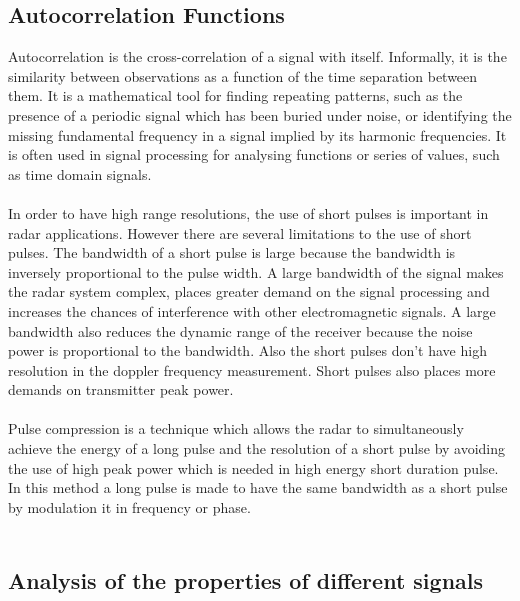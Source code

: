 \documentclass{article}
\begin{document}
\subsection{Autocorrelation Functions}
Autocorrelation is the cross-correlation of a signal with itself. Informally, it is the similarity between observations as a function of the time separation between them. It is a mathematical tool for finding repeating patterns, such as the presence of a periodic signal which has been buried under noise, or identifying the missing fundamental frequency in a signal implied by its harmonic frequencies. It is often used in signal processing for analysing functions or series of values, such as time domain signals. \cite{Wiki:2012auto}
\\
\\
In order to have high range resolutions, the use of short pulses is important in radar applications. However there are several limitations to the use of short pulses. The bandwidth of a short pulse is large because the bandwidth is inversely proportional to the pulse width. A large bandwidth of the signal makes the radar system complex, places greater demand on the signal processing and increases the chances of interference with other electromagnetic signals. A large bandwidth also reduces the dynamic range of the receiver because the noise power is proportional to the bandwidth. Also the short pulses don't have high resolution in the doppler frequency measurement. Short pulses also places more demands on transmitter peak power. \cite{Skolnik:2001irs}\\
\\
Pulse compression is a technique which allows the radar to simultaneously achieve the energy of a long pulse and the resolution of a short pulse by avoiding the use of high peak power which is needed in high energy short duration pulse. In this method a long pulse is made to have the same bandwidth as a short pulse by modulation it in frequency or phase. \cite{Skolnik:2001irs}\\
\\

\subsection{Analysis of the properties of different signals}
\end{document}

